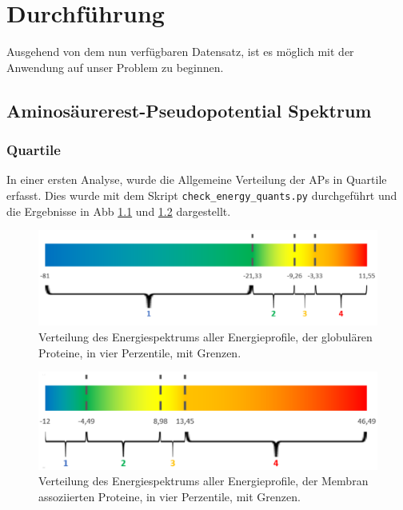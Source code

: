 \chapter{Durchführung}

Ausgehend von dem nun verfügbaren Datensatz, ist es möglich mit der Anwendung auf unser Problem zu beginnen.



\section{Aminosäurerest-Pseudopotential Spektrum}


\subsection{Quartile}
In einer ersten Analyse, wurde die Allgemeine Verteilung der \ac{APs} in Quartile erfasst. Dies wurde mit dem Skript \texttt{check\_energy\_quants.py} durchgeführt und die Ergebnisse in \ac{Abb} \ref{fig:quartiles_glob} und \ref{fig:quartiles_memb} dargestellt. 
%
\begin{figure}
\centering
\includegraphics[width=.95\textwidth]{images/Quartil_glob.png}
\caption{Verteilung des Energiespektrums aller Energieprofile, der globulären Proteine, in vier Perzentile, mit Grenzen.}
\label{fig:quartiles_glob}
\end{figure}

\begin{figure}
\centering
\includegraphics[width=.95\textwidth]{images/Quartil_memb.png}
\caption{Verteilung des Energiespektrums aller Energieprofile, der Membran assoziierten Proteine, in vier Perzentile, mit Grenzen.}
\label{fig:quartiles_memb}
\end{figure}

